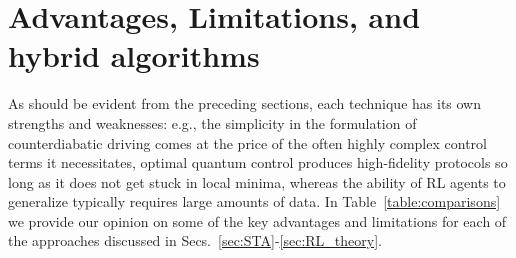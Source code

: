 \section{Advantages, Limitations, and hybrid algorithms}
\label{sec:comparison}

As should be evident from the preceding sections, each technique has its own strengths and weaknesses: e.g., the simplicity in the formulation of counterdiabatic driving comes at the price of the often highly complex control terms it necessitates, optimal quantum control produces high-fidelity protocols so long as it does not get stuck in local minima, whereas the ability of RL agents to generalize typically requires large amounts of data. In Table~\ref{table:comparisons} we provide our opinion on some of the key advantages and limitations for each of the approaches discussed in Secs.~\ref{sec:STA}-\ref{sec:RL_theory}.

